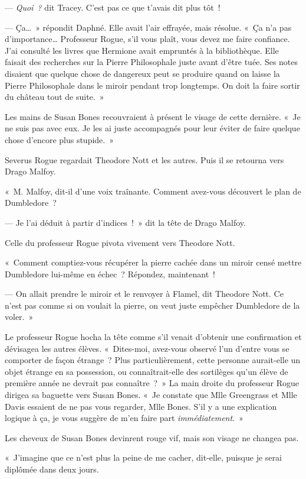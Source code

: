 --- \emph{Quoi~?} dit Tracey. C'est pas ce que t'avais dit plus tôt~!

--- Ça…~» répondit Daphné. Elle avait l'air effrayée, mais résolue. «~Ça n'a pas d'importance… Professeur Rogue, s'il vous plaît, vous devez me faire confiance. J'ai consulté les livres que Hermione avait empruntés à la bibliothèque. Elle faisait des recherches sur la Pierre Philosophale juste avant d'être tuée. Ses notes disaient que quelque chose de dangereux peut se produire quand on laisse la Pierre Philosophale dans le miroir pendant trop longtemps. On doit la faire sortir du château tout de suite.~»

Les mains de Susan Bones recouvraient à présent le visage de cette dernière. «~Je ne suis pas avec eux. Je les ai juste accompagnés pour leur éviter de faire quelque chose d'encore plus stupide.~»

Severus Rogue regardait Theodore Nott et les autres. Puis il se retourna vers Drago Malfoy.

«~M. Malfoy, dit-il d'une voix traînante. Comment avez-vous découvert le plan de Dumbledore~?

--- Je l'ai déduit à partir d'indices~!~» dit la tête de Drago Malfoy.

Celle du professeur Rogue pivota vivement vers Theodore Nott.

«~Comment comptiez-vous récupérer la pierre cachée dans un miroir censé mettre Dumbledore lui-même en échec~? Répondez, maintenant~!

--- On allait prendre le miroir et le renvoyer à Flamel, dit Theodore Nott. Ce n'est pas comme si on voulait la pierre, on veut juste empêcher Dumbledore de la voler.~»

Le professeur Rogue hocha la tête comme s'il venait d'obtenir une confirmation et dévisagea les autres élèves. «~Dites-moi, avez-vous observé l'un d'entre vous se comporter de façon étrange~? Plus particulièrement, cette personne aurait-elle un objet étrange en sa possession, ou connaîtrait-elle des sortilèges qu'un élève de première année ne devrait pas connaître~?~» La main droite du professeur Rogue dirigea sa baguette vers Susan Bones. «~Je constate que Mlle Greengrass et Mlle Davis essaient de ne pas vous regarder, Mlle Bones. S'il y a une explication logique à ça, je vous suggère de m'en faire part \emph{immédiatement}.~»

Les cheveux de Susan Bones devinrent rouge vif, mais son visage ne changea pas.

«~J'imagine que ce n'est plus la peine de me cacher, dit-elle, puisque je serai diplômée dans deux jours.

